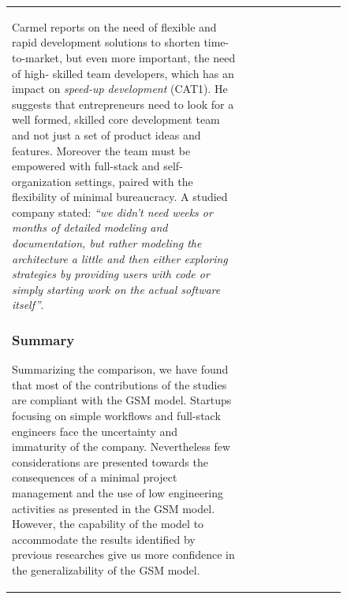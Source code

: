\documentclass[12pt,journal,compsoc]{../sty/IEEEtran}
\begin{document}
\begin{table}[!t]
\begin{figure}[!t]
\begin{compactitem}
\begin{table}[!t]
\begin{tabular}{|l||c||c||c||c||c||c||c||c||c|}
Carmel \cite{Camel1994a} reports on the need of flexible and rapid development
solutions to shorten time-to-market, but even more important, the need of  high-
skilled team developers, which has an impact on \textit{speed-up  development}
(CAT1). He suggests that entrepreneurs need to look for a well  formed, skilled
core development team and not just a set of product ideas and  features.
Moreover the team must be empowered with full-stack and  self-organization
settings, paired with the flexibility of minimal bureaucracy.  A studied company
stated: \textit{``we didn't need weeks or months of detailed  modeling and
documentation, but rather modeling the architecture a little and  then either
exploring strategies by providing users with code or simply starting  work on
the actual software itself''}.



\subsubsection{Summary} Summarizing the comparison, we have found that most of
the  contributions of the studies are compliant with the GSM model. Startups
focusing on simple workflows and full-stack engineers face the uncertainty and
immaturity of the company. Nevertheless few considerations are presented towards
the consequences of a minimal project management and the use of low engineering
activities as presented in the GSM model. However, the capability of the model
to accommodate the results identified by previous researches give us more
confidence in the generalizability of the GSM model.


\end{tabular}
\end{table}
\end{compactitem}
\end{figure}
\end{table}
\end{document}
